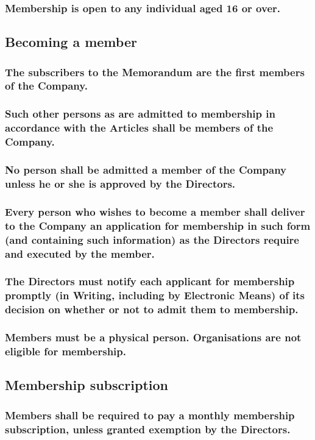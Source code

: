 \documentclass[12pt]{article}
\begin{document}
\subsubsection{Membership is open to any individual aged 16 or over.}

\subsection{Becoming a member}
\subsubsection{The subscribers to the Memorandum are the first members of the Company.}
\subsubsection{Such other persons as are admitted to membership in accordance with the Articles shall be members of the Company.}
\subsubsection{No person shall be admitted a member of the Company unless he or she is approved by the Directors.}
\subsubsection{Every person who wishes to become a member shall deliver to the Company an application for membership in such form (and containing such information) as the Directors require and executed by the member.} %
\subsubsection{The Directors must notify each applicant for membership promptly (in Writing, including by Electronic Means) of its decision on whether or not to admit them to membership.}
\subsubsection{Members must be a physical person. Organisations are not eligible for membership.}

\subsection{Membership subscription}
\subsubsection{Members shall be required to pay a monthly membership subscription, unless granted exemption by the Directors.}
\end{document}
